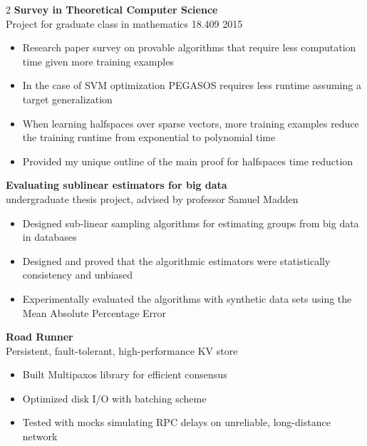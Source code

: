 \documentclass{article}
\newenvironment{changemargin}[2]{%
  \begin{list}{}{%
    \setlength{\topsep}{0pt}%
    \setlength{\leftmargin}{#1}%
    \setlength{\rightmargin}{#2}%
    \setlength{\listparindent}{\parindent}%
    \setlength{\itemindent}{\parindent}%
    \setlength{\parsep}{\parskip}%
  }%
  \item[]}{\end{list}
}
\newenvironment{body} {
	\vspace*{-16pt}
	\begin{changemargin}{-0.25in}{-0.5in}
  }	
	{\end{changemargin}
}
\begin{document}
\begin{body}
\begin{multicols}{2}
        \textbf {Survey in Theoretical Computer Science}\\
        Project for graduate class in mathematics 18.409 2015\\
		\vspace*{-3pt}
		\begin{itemize} \itemsep -2pt
			\item Research paper survey on provable algorithms that require less computation time given more training examples
            \item In the case of SVM optimization PEGASOS requires less runtime assuming a target generalization
            \item When learning halfspaces over sparse vectors, more training examples reduce the training runtime from exponential to polynomial time
            \item Provided my unique outline of the main proof for halfspaces time reduction
		\end{itemize}
		\vspace{5pt}
        
        \textbf {Evaluating sublinear estimators for big data}\\
        undergraduate thesis project, advised by professor Samuel Madden \\
		\vspace*{-3pt}
		\begin{itemize} \itemsep -2pt
			\item Designed sub-linear sampling algorithms for estimating groups from big data in databases
            \item Designed and proved that the algorithmic estimators were statistically consistency and unbiased
            \item Experimentally evaluated the algorithms with synthetic data sets using the Mean Absolute Percentage Error
		\end{itemize}
		\vspace{5pt}
	
		\textbf {Road Runner}\\
		Persistent, fault-tolerant, high-performance KV store \\
		\vspace*{-3pt}
		\begin{itemize} \itemsep -2pt
			\item Built Multipaxos library for efficient consensus
			\item Optimized disk I/O with batching scheme
			\item Tested with mocks simulating RPC delays on unreliable, long-distance network
		\end{itemize}
		\vspace{5pt}
	

\end{multicols}
\end{body}
\end{document}
